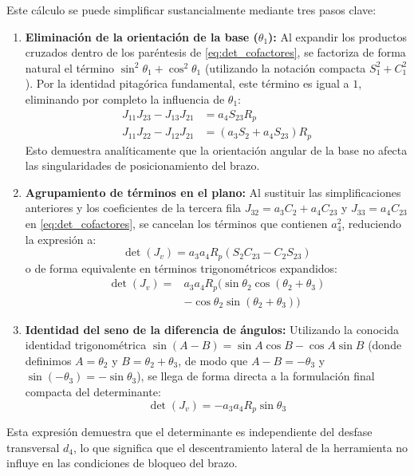 \documentclass[conference,a4paper]{IEEEtran}
\begin{document}
Este cálculo se puede simplificar sustancialmente mediante tres pasos clave:
\begin{enumerate}
    \item \textbf{Eliminación de la orientación de la base ($\theta_1$):} Al expandir los productos cruzados dentro de los paréntesis de \eqref{eq:det_cofactores}, se factoriza de forma natural el término $\sin^2\theta_1 + \cos^2\theta_1$ (utilizando la notación compacta $S_1^2 + C_1^2$). Por la identidad pitagórica fundamental, este término es igual a $1$, eliminando por completo la influencia de $\theta_1$:
    \begin{align}
    J_{11} J_{23} - J_{13} J_{21} &= a_4 S_{23} R_p \\
    J_{11} J_{22} - J_{12} J_{21} &= (a_3 S_2 + a_4 S_{23}) R_p
    \end{align}
    Esto demuestra analíticamente que la orientación angular de la base no afecta las singularidades de posicionamiento del brazo.

    \item \textbf{Agrupamiento de términos en el plano:} Al sustituir las simplificaciones anteriores y los coeficientes de la tercera fila $J_{32} = a_3 C_2 + a_4 C_{23}$ y $J_{33} = a_4 C_{23}$ en \eqref{eq:det_cofactores}, se cancelan los términos que contienen $a_4^2$, reduciendo la expresión a:
    \begin{equation}
    \det(J_v) = a_3 a_4 R_p ( S_2 C_{23} - C_2 S_{23} )
    \end{equation}
    o de forma equivalente en términos trigonométricos expandidos:
    \begin{equation}
    \begin{split}
    \det(J_v) = {}& a_3 a_4 R_p ( \sin\theta_2 \cos(\theta_2+\theta_3) \\
    & - \cos\theta_2 \sin(\theta_2+\theta_3) )
    \end{split}
    \end{equation}

    \item \textbf{Identidad del seno de la diferencia de ángulos:} Utilizando la conocida identidad trigonométrica $\sin(A - B) = \sin A \cos B - \cos A \sin B$ (donde definimos $A = \theta_2$ y $B = \theta_2 + \theta_3$, de modo que $A - B = -\theta_3$ y $\sin(-\theta_3) = -\sin\theta_3$), se llega de forma directa a la formulación final compacta del determinante:
    \begin{equation}
    \det(J_v) = -a_3 a_4 R_p \sin\theta_3
    \label{eq:det_jacobian}
    \end{equation}
\end{enumerate}
Esta expresión demuestra que el determinante es independiente del desfase transversal $d_4$, lo que significa que el descentramiento lateral de la herramienta no influye en las condiciones de bloqueo del brazo.
\end{document}

